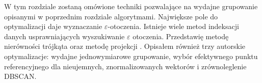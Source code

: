 W tym rozdziale zostaną omówione techniki pozwalające na wydajne grupowanie opisanymi w poprzednim rozdziale algorytmami. Największe pole do optymalizacji daje wyznaczanie $ \varepsilon $-otoczenia. Istnieje wiele metod indeksacji danych usprawniających wyszukiwanie $ \varepsilon $ otoczenia. Przedstawię metodę nierówności trójkąta \cite{tidbscan,cosbyeuc} oraz metodę projekcji \cite{tivsp}. Opisałem również trzy autorskie optymalizacje: wydajne jednowymiarowe grupowanie, wybór efektywnego punktu referencyjnego dla nieujemnych, znormalizowanych wektorów i zrównoleglenie DBSCAN.